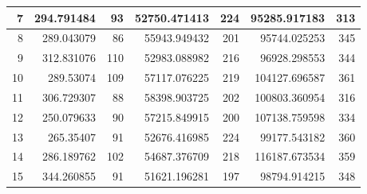 \begin{table}
\begin{adjustwidth}{}{}
{{\begin{tabular}{|r|r|r|r|r|r|r|}
\hline
7                                          & 294.791484                   & 93                                    & 52750.471413                   & 224                                   & 95285.917183                 & 313                                    \\ 
\hline
8                                          & 289.043079                   & 86                                    & 55943.949432                   & 201                                   & 95744.025253                 & 345                                    \\ 
\hline
9                                          & 312.831076                   & 110                                   & 52983.088982                   & 216                                   & 96928.298553                 & 344                                    \\ 
\hline
10                                         & 289.53074                    & 109                                   & 57117.076225                   & 219                                   & 104127.696587                & 361                                    \\ 
\hline
11                                         & 306.729307                   & 88                                    & 58398.903725                   & 202                                   & 100803.360954                & 316                                    \\ 
\hline
12                                         & 250.079633                   & 90                                    & 57215.849915                   & 200                                   & 107138.759598                & 334                                    \\ 
\hline
13                                         & 265.35407                    & 91                                    & 52676.416985                   & 224                                   & 99177.543182                 & 360                                    \\ 
\hline
14                                         & 286.189762                   & 102                                   & 54687.376709                   & 218                                   & 116187.673534                & 359                                    \\ 
\hline
15                                         & 344.260855                   & 91                                    & 51621.196281                   & 197                                   & 98794.914215                 & 348                                    \\ 

\end{tabular}}}
\end{adjustwidth}
\end{table}
